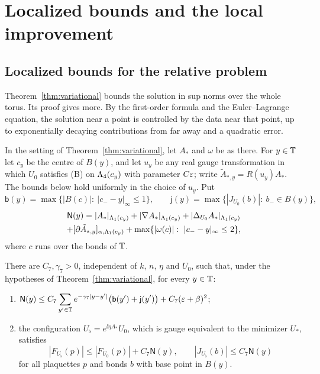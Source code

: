 \section{Localized bounds and the local improvement}\label{sec:improvement}

\subsection{Localized bounds for the relative problem}

Theorem~\ref{thm:variational} bounds the solution in sup norms over the whole torus. Its proof gives more. By the first-order formula and the Euler--Lagrange equation, the solution near a point is controlled by the data near that point, up to exponentially decaying contributions from far away and a quadratic error.

In the setting of Theorem~\ref{thm:variational}, let $A_*$ and $\omega$ be as there. For $y\in\mathbb T$ let $c_y$ be the centre of $B(y)$, and let $u_y$ be any real gauge transformation in which $U_0$ satisfies (B) on $\Lambda_4(c_y)$ with parameter $C\varepsilon$; write $\tilde A_{*,y}=R(u_y)A_*$. The bounds below hold uniformly in the choice of $u_y$. Put
\[
\mathsf b(y)=\max\{|B(c)|:\ |c_--y|_\infty\le1\},\qquad \mathsf j(y)=\max\{|J_{U_0}(b)|:\ b_-\in B(y)\},
\]
\begin{multline*}
\mathsf N(y)=|A_*|_{\Lam_1(c_y)}+|\nabla A_*|_{\Lam_1(c_y)}+|\Lap_{U_0}A_*|_{\Lam_1(c_y)}\\
+\Hol{\partial\tilde A_{*,y}}{\Lam_1(c_y)}+\max\{|\omega(c)|:\ |c_--y|_\infty\le2\},
\end{multline*}
where $c$ runs over the bonds of $\mathbb T$.

\begin{proposition}\label{prop:localized}
There are $C_7,\gamma_7>0$, independent of $k$, $n$, $\eta$ and $U_0$, such that, under the hypotheses of Theorem~\ref{thm:variational}, for every $y\in\mathbb T$:
\begin{enumerate}[label=(\alph*)]
\item $\displaystyle\mathsf N(y)\le C_7\sum_{y'\in\mathbb T}e^{-\gamma_7|y-y'|}\big(\mathsf b(y')+\mathsf j(y')\big)+C_7(\varepsilon+\beta)^2$;
\item the configuration $U_\flat=e^{\ii\eta A_*}U_0$, which is gauge equivalent to the minimizer $U_*$, satisfies
\[
|F_{U_\flat}(p)|\le|F_{U_0}(p)|+C_7\mathsf N(y),\qquad|J_{U_\flat}(b)|\le C_7\mathsf N(y)
\]
for all plaquettes $p$ and bonds $b$ with base point in $B(y)$.
\end{enumerate}
\end{proposition}

